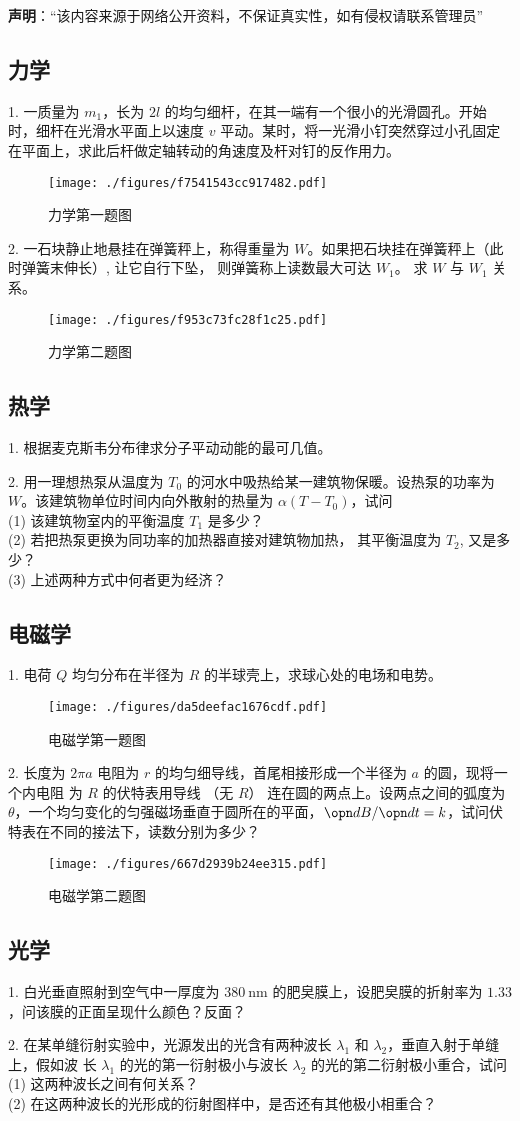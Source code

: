 
\textbf{声明}：“该内容来源于网络公开资料，不保证真实性，如有侵权请联系管理员”

\subsection{力学}
1. 一质量为 $m_{1}$，长为 $2l$ 的均匀细杆，在其一端有一个很小的光滑圆孔。开始时，细杆在光滑水平面上以速度 $v$ 平动。某时，将一光滑小钉突然穿过小孔固定在平面上，求此后杆做定轴转动的角速度及杆对钉的反作用力。
\begin{figure}[ht]
\centering
\texttt{[image: ./figures/f7541543cc917482.pdf]}
\caption{力学第一题图} \label{fig_NJU14_1}
\end{figure}
2. 一石块静止地悬挂在弹簧秤上，称得重量为 $W$。如果把石块挂在弹簧秤上（此时弹簧末伸长）, 让它自行下坠， 则弹簧称上读数最大可达 $W_{1}$。 求 $W$ 与 $W_{1}$ 关系。
\begin{figure}[ht]
\centering
\texttt{[image: ./figures/f953c73fc28f1c25.pdf]}
\caption{力学第二题图} \label{fig_NJU14_2}
\end{figure}
\subsection{热学}
1. 根据麦克斯韦分布律求分子平动动能的最可几值。

2. 用一理想热泵从温度为 $T_{0}$ 的河水中吸热给某一建筑物保暖。设热泵的功率为 $W$。该建筑物单位时间内向外散射的热量为 $\alpha\left(T-T_{0}\right)$，试问\\
(1) 该建筑物室内的平衡温度 $T_{1}$ 是多少？\\
(2) 若把热泵更换为同功率的加热器直接对建筑物加热， 其平衡温度为 $T_{2}$, 又是多少？\\
(3) 上述两种方式中何者更为经济？\\
\subsection{电磁学}
1. 电荷 $Q$ 均匀分布在半径为 $R$ 的半球壳上，求球心处的电场和电势。
\begin{figure}[ht]
\centering
\texttt{[image: ./figures/da5deefac1676cdf.pdf]}
\caption{电磁学第一题图} \label{fig_NJU14_4}
\end{figure}
2. 长度为 $2 \pi a$ 电阻为 $r$ 的均匀细导线，首尾相接形成一个半径为 $a$ 的圆，现将一个内电阻 为 $R$ 的伏特表用导线 （无 $R$） 连在圆的两点上。设两点之间的弧度为 $\theta$，一个均匀变化的匀强磁场垂直于圆所在的平面，$\opn dB/\opn dt =k$，试问伏特表在不同的接法下，读数分别为多少？
\begin{figure}[ht]
\centering
\texttt{[image: ./figures/667d2939b24ee315.pdf]}
\caption{电磁学第二题图} \label{fig_NJU14_3}
\end{figure}
\subsection{光学}
1. 白光垂直照射到空气中一厚度为 $380 \mathrm{~nm}$ 的肥㚖膜上，设肥㚖膜的折射率为 $1.33$，问该膜的正面呈现什么颜色？反面？

2. 在某单缝衍射实验中，光源发出的光含有两种波长 $\lambda_{1}$ 和 $\lambda_{2}$，垂直入射于单缝上，假如波 长 $\lambda_{1}$ 的光的第一衍射极小与波长 $\lambda_{2}$ 的光的第二衍射极小重合，试问\\
(1) 这两种波长之间有何关系？\\
(2) 在这两种波长的光形成的衍射图样中，是否还有其他极小相重合？
